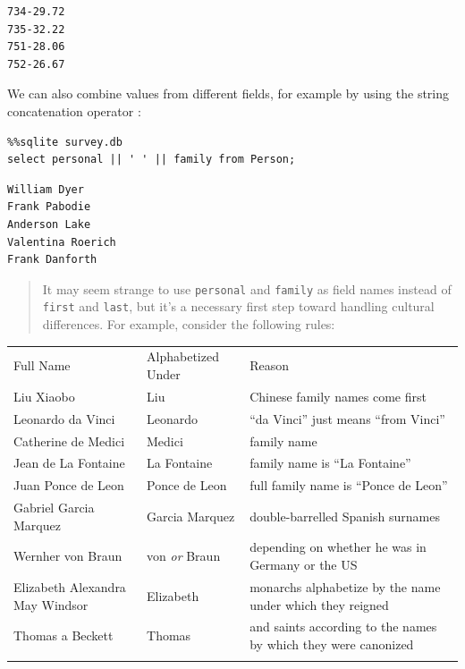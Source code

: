 \documentclass{book}
\begin{document}
\begin{verbatim}
734-29.72
735-32.22
751-28.06
752-26.67
\end{verbatim}

We can also combine values from different fields, for example by using
the string concatenation operator \texttt{\textbar{}\textbar{}}:

\begin{verbatim}
%%sqlite survey.db
select personal || ' ' || family from Person;
\end{verbatim}

\begin{verbatim}
William Dyer
Frank Pabodie
Anderson Lake
Valentina Roerich
Frank Danforth
\end{verbatim}

\begin{quote}
It may seem strange to use \texttt{personal} and \texttt{family} as
field names instead of \texttt{first} and \texttt{last}, but it's a
necessary first step toward handling cultural differences. For example,
consider the following rules:
\end{quote}

\begin{tabular}{@{}lll@{}}
\hline\noalign{\medskip}
Full Name & Alphabetized Under & Reason
\\\noalign{\medskip}
\hline\noalign{\medskip}
Liu Xiaobo & Liu & Chinese family names come first
\\\noalign{\medskip}
Leonardo da Vinci & Leonardo & ``da Vinci'' just means ``from Vinci''
\\\noalign{\medskip}
Catherine de Medici & Medici & family name
\\\noalign{\medskip}
Jean de La Fontaine & La Fontaine & family name is ``La Fontaine''
\\\noalign{\medskip}
Juan Ponce de Leon & Ponce de Leon & full family name is ``Ponce de
Leon''
\\\noalign{\medskip}
Gabriel Garcia Marquez & Garcia Marquez & double-barrelled Spanish
surnames
\\\noalign{\medskip}
Wernher von Braun & von \emph{or} Braun & depending on whether he was in
Germany or the US
\\\noalign{\medskip}
Elizabeth Alexandra May Windsor & Elizabeth & monarchs alphabetize by
the name under which they reigned
\\\noalign{\medskip}
Thomas a Beckett & Thomas & and saints according to the names by which
they were canonized
\\\noalign{\medskip}
\hline
\end{tabular}
\end{document}
